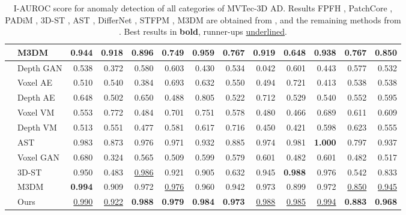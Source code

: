 \begin{table}[ht]
\begin{tabular}{cl|r|r|r|r|r|r|r|r|r|r|r}
& M3DM & 0.944 & 0.918 & 0.896 & 0.749 & 0.959 & 0.767 & 0.919 & 0.648 & 0.938 & 0.767 & 0.850 \\
\hline
\parbox[t]{0.5mm}{} & Depth GAN & 0.538 & 0.372 & 0.580 & 0.603 & 0.430 & 0.534 & 0.042 & 0.601 & 0.443 & 0.577 & 0.532 \\
& Voxel AE & 0.510 & 0.540 & 0.384 & 0.693 & 0.632 & 0.550 & 0.494 & 0.721 & 0.413 & 0.538 & 0.538 \\
& Depth AE & 0.648 & 0.502 & 0.650 & 0.488 & 0.805 & 0.522 & 0.712 & 0.529 & 0.540 & 0.552 & 0.595 \\
& Voxel VM & 0.553 & 0.772 & 0.484 & 0.701 & 0.751 & 0.578 & 0.480 & 0.466 & 0.689 & 0.611 & 0.609 \\
& Depth VM & 0.513 & 0.551 & 0.477 & 0.581 & 0.617 & 0.716 & 0.450 & 0.421 & 0.598 & 0.623 & 0.555 \\
& AST & 0.983 & 0.873 & 0.976 & 0.971 & 0.932 & 0.885 & 0.974 & 0.981 & \textbf{1.000} & 0.797 & 0.937 \\
& Voxel GAN & 0.680 & 0.324 & 0.565 & 0.509 & 0.599 & 0.579 & 0.601 & 0.482 & 0.601 & 0.482 & 0.517 \\
& 3D-ST & 0.950 & 0.483 & \underline{0.986} & 0.921 & 0.905 & 0.632 & 0.945 & \textbf{0.988} & 0.976 & 0.542 & 0.833 \\
& M3DM & \textbf{0.994} & 0.909 & 0.972 & \underline{0.976} & 0.960 & 0.942 & 0.973 & 0.899 & 0.972 & \underline{0.850} & \underline{0.945} \\
& Ours & \underline{0.990} & \underline{0.922} & \textbf{0.988} & \textbf{0.979} & \textbf{0.984} & \textbf{0.973} & \underline{0.988} & \underline{0.985} & \underline{0.994} & \textbf{0.883} & \textbf{0.968} \\
\hline
\end{tabular}
\caption{\label{tab:1} I-AUROC score for anomaly detection of all categories of MVTec-3D AD. Results FPFH \cite{horwitz2022empirical}, PatchCore \cite{roth2022towards}, PADiM \cite{defard2021padim}, 3D-ST \cite{bergmann2023anomaly}, AST \cite{rudolph2023asymmetric}, DifferNet \cite{rudolph2021same}, STFPM \cite{wang2021student}, M3DM \cite{wang2023multimodal} are obtained from \cite{wang2023multimodal}, and the remaining methods from \cite{bergmann2022mvtec}. Best results in \textbf{bold}, runner-ups \underline{underlined}.}
\end{table}

